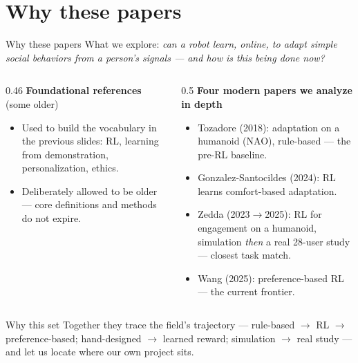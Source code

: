 \documentclass[aspectratio=169,10pt]{beamer}
\begin{document}
\section{Why these papers}

\begin{frame}{Why these papers}
  {\footnotesize What we explore: \emph{can a robot learn, online, to adapt simple social behaviors from a person's signals --- and how is this being done now?}}
  \vspace{0.5em}
  \begin{columns}[T]
    \begin{column}{0.46\textwidth}
      \textbf{Foundational references} (some older)
      \begin{itemize}\footnotesize
        \item Used to build the vocabulary in the previous slides: RL, learning from demonstration, personalization, ethics.
        \item Deliberately allowed to be older --- core definitions and methods do not expire.
      \end{itemize}
    \end{column}
    \begin{column}{0.5\textwidth}
      \textbf{Four modern papers we analyze in depth}
      \begin{itemize}\footnotesize
        \item Tozadore (2018): adaptation on a humanoid (NAO), rule-based --- the pre-RL baseline.
        \item Gonzalez-Santocildes (2024): RL learns comfort-based adaptation.
        \item Zedda (2023$\to$2025): RL for engagement on a humanoid, simulation \emph{then} a real 28-user study --- closest task match.
        \item Wang (2025): preference-based RL --- the current frontier.
      \end{itemize}
    \end{column}
  \end{columns}
  \vspace{0.4em}
  \begin{block}{Why this set}
    Together they trace the field's trajectory --- rule-based $\to$ RL $\to$ preference-based; hand-designed $\to$ learned reward; simulation $\to$ real study --- and let us locate where our own project sits.
  \end{block}
\end{frame}
\end{document}

